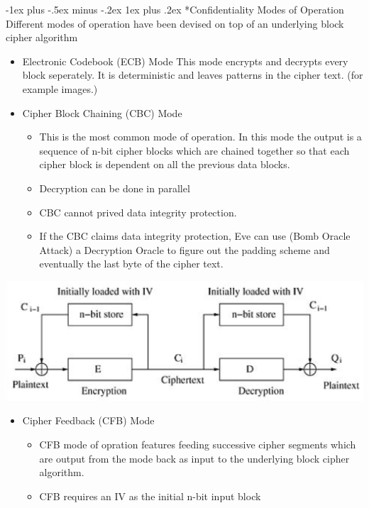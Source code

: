 \documentclass[3pt,landscape]{article}
\makeatletter
\renewcommand{\subsubsection}{\@startsection{subsubsection}{3}{0mm}%
                            {-1ex plus -.5ex minus -.2ex}%
                            {1ex plus .2ex}%
                            {\normalfont\small\bfseries}}
\makeatother
\begin{document}
\begin{multicols}{3}
\subsubsection*{Confidentiality Modes of Operation}
Different modes of operation have been devised on top of an underlying block cipher algorithm
\begin{itemize}
    \item Electronic Codebook (ECB) Mode
        This mode encrypts and decrypts every block seperately. It is deterministic and leaves patterns in the cipher text. (for example images.)
    \item Cipher Block Chaining (CBC) Mode
        \begin{itemize}
            \item This is the most common mode of operation. In this mode the output is a sequence of n-bit cipher blocks which are chained together so that each cipher block is dependent on all the previous data blocks.
            \item Decryption can be done in parallel
            \item CBC cannot prived data integrity protection.
            \item If the CBC claims data integrity protection, Eve can use (Bomb Oracle Attack) a Decryption Oracle to figure out the padding scheme and eventually the last byte of the cipher text.
        \end{itemize}
\end{itemize}
\begin{center}
\includegraphics[scale=.33]{CBCMode}
\end{center}
\begin{itemize}
    \item Cipher Feedback (CFB) Mode
        \begin{itemize}
            \item CFB mode of opration features feeding successive cipher segments which are output from the mode back as input to the underlying block cipher algorithm.
            \item CFB requires an IV as the initial n-bit input block

\end{itemize}
\end{itemize}
\end{multicols}
\end{document}

